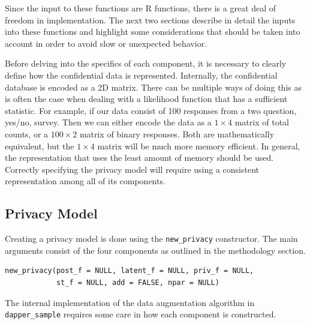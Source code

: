 Since the input to these functions are R functions, there is a great deal of freedom
in implementation. The next two sections describe in detail the inputs into
these functions and highlight some considerations that should be taken
into account in order to avoid slow or unexpected behavior.

Before delving into the specifics of each component, it is necessary to clearly
define how the confidential data is represented. Internally, the
confidential database is encoded as a 2D matrix. There can be multiple ways
of doing this as is often the case when dealing with a likelihood function
that has a sufficient statistic. For example, if our data consist
of 100 responses from a two question, yes/no, survey. Then we can either encode
the data as a \(1 \times 4\) matrix of total counts, or a \(100 \times 2\) matrix of binary responses. Both are mathematically
equivalent, but the \(1 \times 4\) matrix will be much more memory efficient.
In general, the representation that uses the least amount of memory should be
used. Correctly specifying the privacy model will require using a consistent
representation among all of its components.

\hypertarget{privacy-model}{%
\subsection{Privacy Model}\label{privacy-model}}

Creating a privacy model is done using the \texttt{new\_privacy} constructor. The
main arguments consist of the four components as outlined in the methodology
section.

\begin{verbatim}
new_privacy(post_f = NULL, latent_f = NULL, priv_f = NULL,
            st_f = NULL, add = FALSE, npar = NULL)
\end{verbatim}

The internal implementation of the data augmentation algorithm in \texttt{dapper\_sample} requires
some care in how each component is constructed.

